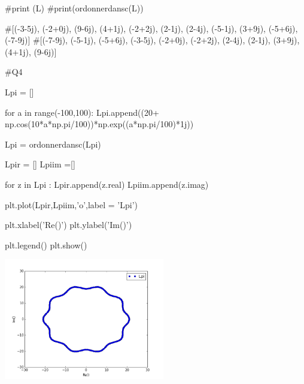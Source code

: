 \documentclass[10pt,fleqn]{article} %
\begin{document}
\begin{corrige}
\begin{python}
#print (L)
#print(ordonnerdansc(L))

#[(-3-5j), (-2+0j), (9-6j), (4+1j), (-2+2j), (2-1j), (2-4j), (-5-1j), (3+9j), (-5+6j), (-7-9j)]
#[(-7-9j), (-5-1j), (-5+6j), (-3-5j), (-2+0j), (-2+2j), (2-4j), (2-1j), (3+9j), (4+1j), (9-6j)]


#Q4

Lpi = []

for a in range(-100,100):
    Lpi.append((20+ np.cos(10*a*np.pi/100))*np.exp((a*np.pi/100)*1j))

Lpi = ordonnerdansc(Lpi)

Lpir = []
Lpiim =[]

for z in Lpi :
        Lpir.append(z.real)
        Lpiim.append(z.imag)
        
plt.plot(Lpir,Lpiim,'o',label = 'Lpi')

plt.xlabel('Re()')
plt.ylabel('Im()')

plt.legend()
plt.show()
\end{python}
\begin{center}
\includegraphics[width=7cm]{programmes/Exercice_2016_03/figure_1}
\end{center}
\end{corrige}
\end{document}
